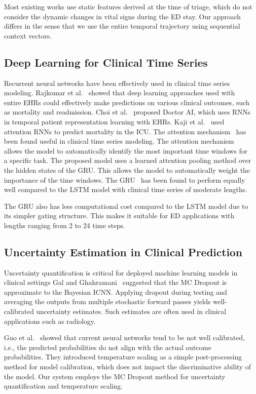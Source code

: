 \documentclass[conference]{IEEEtran}
\begin{document}
Most existing works use static features derived at the time of triage, which do not consider the dynamic changes in vital signs during the ED stay. Our approach differs in the sense that we use the entire temporal trajectory using sequential context vectors.

\subsection{Deep Learning for Clinical Time Series}

Recurrent neural networks have been effectively used in clinical time series modeling. Rajkomar et al.~\cite{Rajkomar2018} showed that deep learning approaches used with entire EHRs could effectively make predictions on various clinical outcomes, such as mortality and readmission. Choi et al.~\cite{Choi2016} proposed Doctor AI, which uses RNNs in temporal patient representation learning with EHRs. Kaji et al.~\cite{Kaji2019} used attention RNNs to predict mortality in the ICU. The attention mechanism~\cite{Bahdanau2015} has been found useful in clinical time series modeling. The attention mechanism allows the model to automatically identify the most important time windows for a specific task. The proposed model uses a learned attention pooling method over the hidden states of the GRU. This allows the model to automatically weight the importance of the time windows. The GRU~\cite{Cho2014} has been found to perform equally well compared to the LSTM model with clinical time series of moderate lengths.

The GRU also has less computational cost compared to the LSTM model due to its simpler gating structure. This makes it suitable for ED applications with lengths ranging from 2 to 24 time steps.

\subsection{Uncertainty Estimation in Clinical Prediction}

Uncertainty quantification is critical for deployed machine learning models in clinical settings Gal and Ghahramani~\cite{Gal2016} suggested that the MC Dropout is approximate to the Bayesian ICNN. Applying dropout during testing and averaging the outputs from multiple stochastic forward passes yields well-calibrated uncertainty estimates. Such estimates are often used in clinical applications such as radiology.

Guo et al.~\cite{Guo2017} showed that current neural networks tend to be not well calibrated, i.e., the predicted probabilities do not align with the actual outcome probabilities. They introduced temperature scaling as a simple post-processing method for model calibration, which does not impact the discriminative ability of the model. Our system employs the MC Dropout method for uncertainty quantification and temperature scaling.
\end{document}
